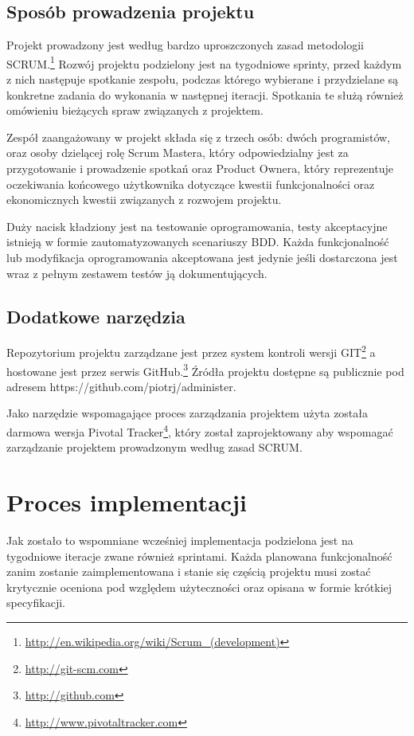   \subsection{Sposób prowadzenia projektu}
  Projekt prowadzony jest według bardzo uproszczonych zasad metodologii SCRUM.\footnote{\url{http://en.wikipedia.org/wiki/Scrum_(development)}} \nocite{wiki_scrum} Rozwój projektu podzielony jest na tygodniowe sprinty, przed każdym z nich następuje spotkanie zespołu, podczas którego wybierane i przydzielane są konkretne zadania do wykonania w następnej iteracji. Spotkania te służą również omówieniu bieżących spraw związanych z projektem.
  
  Zespół zaangażowany w projekt składa się z trzech osób: dwóch programistów, oraz osoby dzielącej rolę Scrum Mastera, który odpowiedzialny jest za przygotowanie i prowadzenie spotkań oraz Product Ownera, który reprezentuje oczekiwania końcowego użytkownika dotyczące kwestii funkcjonalności oraz ekonomicznych kwestii związanych z rozwojem projektu.
  
  Duży nacisk kładziony jest na testowanie oprogramowania, testy akceptacyjne istnieją w formie zautomatyzowanych scenariuszy BDD. Każda funkcjonalność lub modyfikacja oprogramowania akceptowana jest jedynie jeśli dostarczona jest wraz z pełnym zestawem testów ją dokumentujących.
  
  \subsection{Dodatkowe narzędzia}
  Repozytorium projektu zarządzane jest przez system kontroli wersji GIT\footnote{\url{http://git-scm.com}} a hostowane jest przez serwis GitHub.\footnote{\url{http://github.com}} Źródła projektu dostępne są publicznie pod adresem https://github.com/piotrj/administer.
  
  Jako narzędzie wspomagające proces zarządzania projektem użyta została darmowa wersja Pivotal Tracker\footnote{\url{http://www.pivotaltracker.com}}, który został zaprojektowany aby wspomagać zarządzanie projektem prowadzonym według zasad SCRUM.
  
  \section{Proces implementacji}
  
  Jak zostało to wspomniane wcześniej implementacja podzielona jest na tygodniowe iteracje zwane również sprintami. Każda planowana funkcjonalność zanim zostanie zaimplementowana i stanie się częścią projektu musi zostać krytycznie oceniona pod względem użyteczności oraz opisana w formie krótkiej specyfikacji.
  

